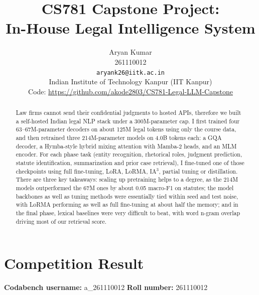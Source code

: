 \documentclass[11pt, oneside]{article}
\title{CS781 Capstone Project:\\
In-House Legal Intelligence System}
\author{
    Aryan Kumar  \\
    261110012 \\
    {\tt aryank26@iitk.ac.in}\\
    Indian Institute of Technology Kanpur (IIT Kanpur)\\
    Code: \url{https://github.com/akode2803/CS781-Legal-LLM-Capstone}
}
\date{}
\begin{document}
\maketitle
\begin{abstract}
Law firms cannot send their confidential judgments to hosted APIs, therefore we built a self-hosted Indian legal NLP stack under a 300M-parameter cap. I first trained four 63--67M-parameter decoders on about 125M legal tokens using only the course data, and then retrained three 214M-parameter models on 4.0B tokens each: a GQA decoder, a Hymba-style hybrid mixing attention with Mamba-2 heads, and an MLM encoder. For each phase task (entity recognition, rhetorical roles, judgment prediction, statute identification, summarization and prior case retrieval), I fine-tuned one of those checkpoints using full fine-tuning, LoRA, LoRMA, IA$^3$, partial tuning or distillation. There are three key takeaways: scaling up pretraining helps to a degree, as the 214M models outperformed the 67M ones by about 0.05 macro-F1 on statutes; the model backbones as well as tuning methods were essentially tied within seed and test noise, with LoRMA performing as well as full fine-tuning at about half the memory; and in the final phase, lexical baselines were very difficult to beat, with word n-gram overlap driving most of our retrieval score.
\end{abstract}
\section{Competition Result}
\noindent
\textbf{Codabench username:} a\_261110012
\hfill
\textbf{Roll number:} 261110012
\medskip
\end{document}
